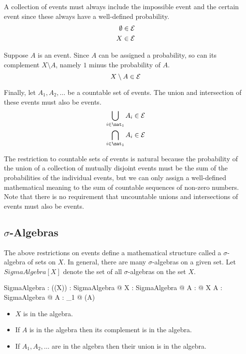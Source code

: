 \documentclass{article}
\begin{document}
A collection of events must always include the impossible event and the certain event since these always have a well-defined probability.
\begin{eqnarray}
	\emptyset \in {\cal E} \\
	X \in {\cal E}
\end{eqnarray}

Suppose $A$ is an event.
Since $A$ can be assigned a probability, so can its complement $ X \setminus A$, namely $1$ minus the probability of $A$.
\begin{equation}
	X \setminus A \in {\cal E}
\end{equation}

Finally, let $A_1, A_2, \ldots$ be a countable set of events. 
The union and intersection of these events must also be events.
\begin{eqnarray}
	\bigcup_{i \in \nat_1} A_i \in {\cal E} \\
	\bigcap_{i \in \nat_1} A_i \in {\cal E} 
\end{eqnarray}

The restriction to countable sets of events is natural because the probability of the union of a collection of mutually disjoint events must be the
sum of the probabilities of the individual events, but we can only assign a well-defined mathematical meaning to the sum of countable sequences of non-zero numbers.
Note that there is no requirement that uncountable unions and intersections of events must also be events.

\subsection{$\sigma$-Algebras}

The above restrictions on events define a mathematical structure called a $\sigma$-algebra of sets on $X$.
In general, there are many $\sigma$-algebras on a given set.
Let $SigmaAlgebra[X]$ denote the set of all $\sigma$-algebras on the set $X$.
\begin{gendef}[X]
	SigmaAlgebra : \power (\power (\power X))
\where
	\forall \calE : SigmaAlgebra @ X \in \calE
\also
	\forall \calE : SigmaAlgebra @ \forall A : \calE @ X \setminus A \in \calE
\also
	\forall \calE : SigmaAlgebra @ \forall A : \nat_1 \fun \calE @ \bigcup (\ran A) \in \calE
\end{gendef}
\begin{itemize}
\item $X$ is in the algebra.
\item If $A$ is in the algebra then its complement is in the algebra.
\item If $A_1, A_2, \ldots$ are in the algebra then their union is in the algebra.
\end{itemize}
\end{document}
